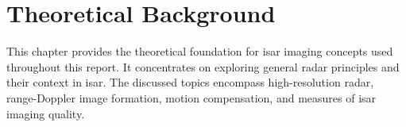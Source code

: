 \documentclass[class=report,11pt,crop=false]{standalone}
\begin{document}
\ifstandalone
\tableofcontents
\fi
\chapter{Theoretical Background \label{ch:theory}} 

This chapter provides the theoretical foundation for \gls{isar} imaging concepts used throughout this report. It concentrates on exploring general radar principles and their context in \gls{isar}. The discussed topics encompass high-resolution radar, range-Doppler image formation, motion compensation, and measures of \gls{isar} imaging quality.



\end{document}
